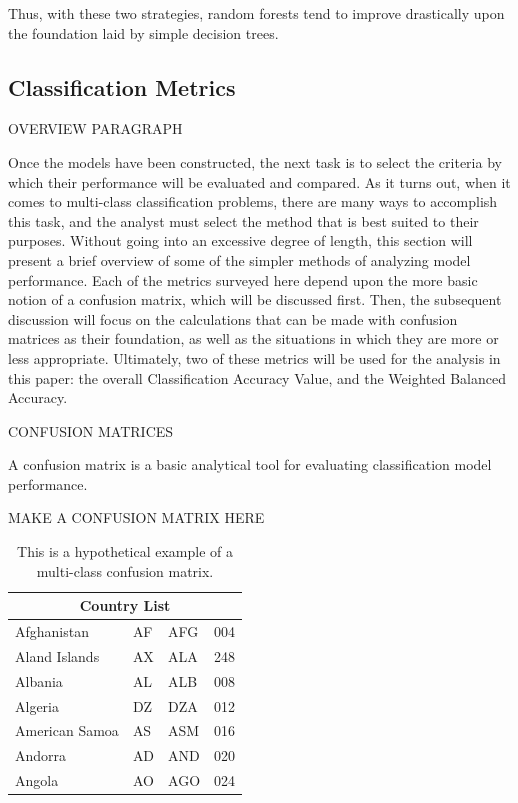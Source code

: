 \documentclass[12pt]{article}
\begin{document}
Thus, with these two strategies, random forests tend to improve drastically upon the 
foundation laid by simple decision trees.

\subsection{Classification Metrics}
\label{sec:metr}

OVERVIEW PARAGRAPH

Once the models have been constructed, the next task is to select the criteria 
by which their performance will be evaluated and compared.  As it turns out, 
when it comes to multi-class classification problems, there are many ways to 
accomplish this task, and the analyst must select the method that is best 
suited to their purposes.  Without going into an excessive degree of length, 
this section will present a brief overview of some of the simpler methods of 
analyzing model performance.  Each of the metrics surveyed here depend upon 
the more basic notion of a confusion matrix, which will be discussed first.  
Then, the subsequent discussion will focus on the calculations that can be 
made with confusion matrices as their foundation, as well as the situations 
in which they are more or less appropriate.  Ultimately, two of these metrics 
will be used for the analysis in this paper: the overall Classification 
Accuracy Value, and the Weighted Balanced Accuracy.   

CONFUSION MATRICES

A confusion matrix is a basic analytical tool for evaluating classification model performance.  

MAKE A CONFUSION MATRIX HERE
\begin{table}[tbp]
\caption{This is a hypothetical example of a multi-class confusion matrix.}
\label{tab:conf}
\centering
\begin{tabular}{ |p{3cm}||p{3cm}|p{3cm}|p{3cm}|  }
 \hline
 \multicolumn{4}{|c|}{Country List} \\
 \hline
 Afghanistan   & AF    &AFG&   004\\
 Aland Islands&   AX  & ALA   &248\\
 Albania &AL & ALB&  008\\
 Algeria    &DZ & DZA&  012\\
 American Samoa&   AS  & ASM&016\\
 Andorra& AD  & AND   &020\\
 Angola& AO  & AGO&024\\
 \hline
\end{tabular}
\end{table}
\end{document}
